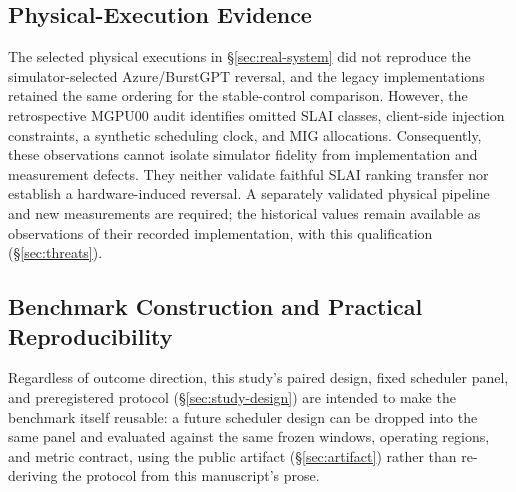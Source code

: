 \subsection{Physical-Execution Evidence}

The selected physical executions in \S\ref{sec:real-system} did not
reproduce the simulator-selected Azure/BurstGPT reversal, and the legacy
implementations retained the same ordering for the stable-control comparison.
However, the retrospective MGPU00 audit identifies omitted SLAI classes,
client-side injection constraints, a synthetic scheduling clock, and MIG
allocations. Consequently, these observations cannot isolate simulator
fidelity from implementation and measurement defects. They neither validate
faithful SLAI ranking transfer nor establish a hardware-induced reversal.
A separately validated physical pipeline and new measurements are required;
the historical values remain available as observations of their recorded
implementation, with this qualification (\S\ref{sec:threats}).

\subsection{Benchmark Construction and Practical Reproducibility}

Regardless of outcome direction, this study's paired design, fixed
scheduler panel, and preregistered protocol (\S\ref{sec:study-design})
are intended to make the benchmark itself reusable: a future scheduler
design can be dropped into the same panel and evaluated against the same
frozen windows, operating regions, and metric contract, using the public
artifact (\S\ref{sec:artifact}) rather than re-deriving the protocol
from this manuscript's prose.
